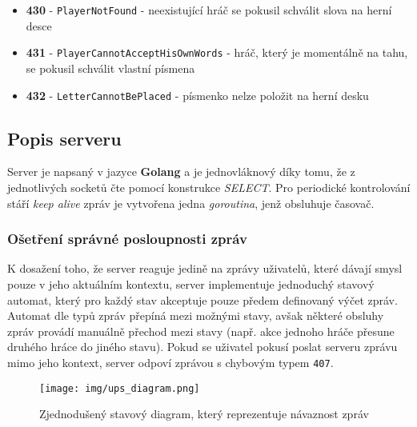 \documentclass[12pt, a4paper]{article}
\begin{document}
\begin{itemize}
			\item \textbf{430} - \texttt{PlayerNotFound} - neexistující hráč se pokusil schválit slova na herní desce
						
			\item \textbf{431} - \texttt{PlayerCannotAcceptHisOwnWords} - hráč, který je momentálně na tahu, se pokusil schválit vlastní písmena
												
			\item \textbf{432} - \texttt{LetterCannotBePlaced} - písmenko nelze položit na herní desku
		\end{itemize}

	    \subsection{Popis serveru}
	    Server je napsaný v jazyce \textbf{Golang} a je jednovláknový díky tomu, že z jednotlivých socketů čte pomocí konstrukce \textit{SELECT}. Pro periodické kontrolování stáří \textit{keep alive} zpráv je vytvořena jedna \textit{goroutina}, jenž obsluhuje časovač.
	  		\subsubsection{Ošetření správné posloupnosti zpráv}
	  		K dosažení toho, že server reaguje jedině na zprávy uživatelů, které dávají smysl pouze v jeho aktuálním kontextu, server implementuje jednoduchý stavový automat, který pro každý stav akceptuje pouze předem definovaný výčet zpráv. Automat dle typů zpráv přepíná mezi možnými stavy, avšak některé obsluhy zpráv provádí manuálně přechod mezi stavy (např. akce jednoho hráče přesune druhého hráce do jiného stavu). Pokud se uživatel pokusí poslat serveru zprávu mimo jeho kontext, server odpoví zprávou s chybovým typem \texttt{407}.
\begin{figure}[!ht]
\centering
{\texttt{[image: img/ups\_diagram.png]}}
\caption{Zjednodušený stavový diagram, který reprezentuje návaznost zpráv}
\label{fig:photo}
\end{figure}
\pagebreak
\end{document}

